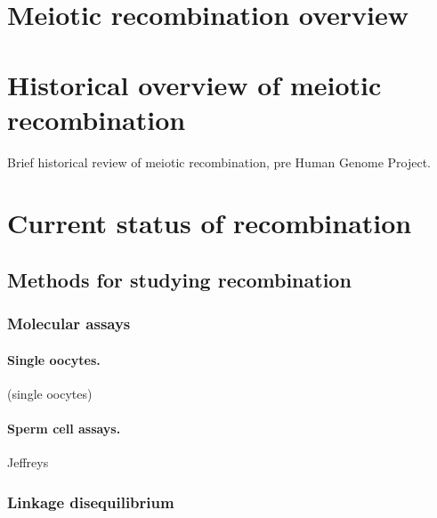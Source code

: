 
\section{Meiotic recombination overview}

\section{Historical overview of meiotic recombination}

Brief historical review of meiotic recombination, pre Human Genome Project.

\section{Current status of recombination}

\subsection{Methods for studying recombination}
\subsubsection{Molecular assays}
\paragraph{Single oocytes.}
\citet{Hou2013} (single oocytes)

\paragraph{Sperm cell assays.}
Jeffreys

\citet{Lu2012b}
\citet{Wang2012}


\subsubsection{Linkage disequilibrium}
